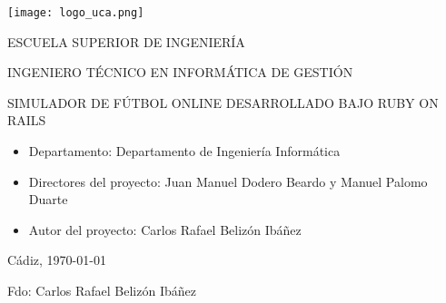 

\begin{center}

  \texttt{[image: logo\_uca.png]} \\

  \vspace{2.0cm}

  \Large{ESCUELA SUPERIOR DE INGENIERÍA} \\

  \vspace{1.0cm}

  \large{INGENIERO TÉCNICO EN INFORMÁTICA DE GESTIÓN} \\

  \vspace{2.0cm}

  \large{SIMULADOR DE FÚTBOL ONLINE DESARROLLADO BAJO RUBY ON RAILS} \\

  \vspace{1.0cm}

\end{center}

\begin{itemize}
\item \large{Departamento: Departamento de Ingeniería Informática}
\item \large{Directores del proyecto: Juan Manuel Dodero Beardo y Manuel Palomo Duarte}
\item \large{Autor del proyecto: Carlos Rafael Belizón Ibáñez}
\end{itemize}

\vspace{1.0cm}

\begin{flushright}
  \large{Cádiz, \today} \\

  \vspace{2.5cm}

  \large{Fdo: Carlos Rafael Belizón Ibáñez}
\end{flushright}
